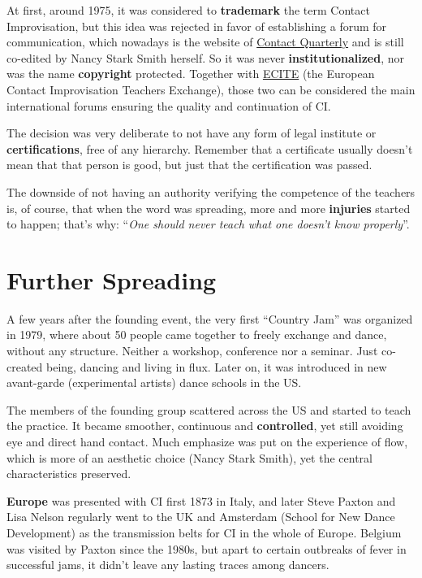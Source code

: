 At first, around 1975, it was considered to \textbf{trademark} the term Contact Improvisation, but this idea was rejected in favor of establishing a forum for communication, which nowadays is the website of \href{https://contactquarterly.com}{Contact Quarterly} and is still co-edited by Nancy Stark Smith herself.
So it was never \textbf{institutionalized}, nor was the name \textbf{copyright} protected.
Together with \href{http://www.ecite.org}{ECITE} (the European Contact Improvisation Teachers Exchange), those two can be considered the main international forums ensuring the quality and continuation of CI\@.

The decision was very deliberate to not have any form of legal institute or \textbf{certifications}, free of any hierarchy.
Remember that a certificate usually doesn't mean that that person is good, but just that the certification was passed.

The downside of not having an authority verifying the competence of the teachers is, of course, that when the word was spreading, more and more \textbf{injuries} started to happen; that's why: ``\textit{One should never teach what one doesn't know properly}''.

\section{Further Spreading}\label{sec:further-spreading}

A few years after the founding event, the very first ``Country Jam'' was organized in 1979, where about 50 people came together to freely exchange and dance, without any structure.
Neither a workshop, conference nor a seminar.
Just co-created being, dancing and living in flux.
Later on, it was introduced in new avant-garde (experimental artists) dance schools in the US\@.

The members of the founding group scattered across the US and started to teach the practice.
It became smoother, continuous and \textbf{controlled}, yet still avoiding eye and direct hand contact.
Much emphasize was put on the experience of flow, which is more of an aesthetic choice (Nancy Stark Smith), yet the central characteristics preserved.

\textbf{Europe} was presented with CI first 1873 in Italy, and later Steve Paxton and Lisa Nelson regularly went to the UK and Amsterdam (School for New Dance Development) as the transmission belts for CI in the whole of Europe.
Belgium was visited by Paxton since the 1980s, but apart to certain outbreaks of fever in successful jams, it didn't leave any lasting traces among dancers.

